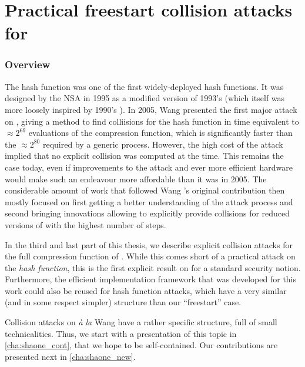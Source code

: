 \part[Collisions explicites pour la fonction de compression de \shaone]
    {Practical freestart collision attacks for \shaone} 
\label{part:sha-1}

\section*{Overview}

The \shaone hash function was one of the first widely-deployed hash functions. It was designed by the NSA in 1995 as a modified version of 1993's \shazero (which itself
was more loosely inspired by 1990's \mdfour). In 2005, Wang \etal presented the first major attack on \shaone, giving a method to find colliisions for the hash function
in time equivalent to $\approx 2^{69}$ evaluations of the compression function, which is significantly faster than the $\approx 2^{80}$ required by a generic process.
However, the high cost of the attack implied that no explicit collision was computed at the time. This remains the case today, even if improvements to the attack
and ever more efficient hardware would make such an endeavour more affordable than it was in 2005.
The considerable amount of work that followed Wang \etal's original contribution then mostly focused on first getting a better understanding of the attack process and
second bringing innovations allowing to explicitly provide collisions for reduced versions of \shaone with the highest number of steps. 

\bigskip

In the third and last part of this thesis, we describe explicit collision attacks for the full compression function of \shaone. While this comes short of a practical
attack on the \emph{hash function}, this is the first explicit result on \shaone for a standard security notion. Furthermore, the efficient implementation framework that was developed
for this work could also be reused for hash function attacks, which have a very similar (and in some respect simpler) structure than our ``freestart'' case.

Collision attacks on \shaone \emph{à la} Wang have a rather specific structure, full of small technicalities. Thus, we start with a presentation of this topic in \autoref{cha:shaone_cont},
that we hope to be self-contained. Our contributions are presented next in \autoref{cha:shaone_new}.

